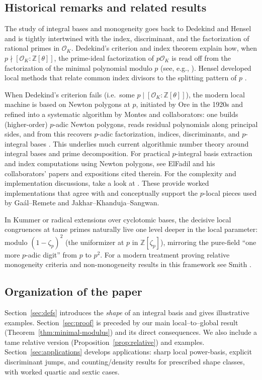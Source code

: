 \documentclass[12pt,a4paper,oneside]{amsart}
\theoremstyle{definition}
\begin{document}
\subsection*{Historical remarks and related results}
The study of integral bases and monogeneity goes back to Dedekind and Hensel and is tightly intertwined with the index, discriminant, and the factorization of rational primes in \(\mathcal O_K\). Dedekind’s criterion and index theorem explain how, when \(p\nmid [\mathcal O_K:\mathbb Z[\theta]]\), the prime-ideal factorization of \(p\mathcal O_K\) is read off from the factorization of the minimal polynomial modulo \(p\) (see, e.g., \cite{Dedekind1878}). Hensel developed local methods that relate common index divisors to the splitting pattern of \(p\) \cite{Hensel1908}. 

When Dedekind’s criterion fails (i.e.\ some \(p\mid [\mathcal O_K:\mathbb Z[\theta]]\)), the modern local machine is based on Newton polygons at \(p\), initiated by Ore in the 1920s and refined into a systematic algorithm by Montes and collaborators: one builds (higher-order) \(p\)-adic Newton polygons, reads residual polynomials along principal sides, and from this recovers \(p\)-adic factorization, indices, discriminants, and \(p\)-integral bases \cite{Ore28,MN92,GMN12,GMN15}. This underlies much current algorithmic number theory around integral bases and prime decomposition. For practical $p$-integral basis extraction and index computations using Newton polygons, see ElFadil and his collaborators’ papers \cite{EMN12,Elf20} and expositions cited therein. For the complexity and implementation discussions, take a look at \cite{BNS13}. These provide worked implementations that agree with and conceptually support the $p$-local pieces used by Ga\'al--Remete and Jakhar--Khanduja--Sangwan.

In Kummer or radical extensions over cyclotomic bases, the decisive local congruences at tame primes naturally live one level deeper in the local parameter: modulo \((1-\zeta_p)^2\) (the uniformizer at \(p\) in \(\mathbb Z[\zeta_p]\)), mirroring the pure-field “one more \(p\)-adic digit” from \(p\) to \(p^2\). For a modern treatment proving relative monogeneity criteria and non-monogeneity results in this framework see Smith \cite{Smi19,Smi21}. 

\subsection*{Organization of the paper}
Section~\ref{sec:defs} introduces the \emph{shape} of an integral basis and gives illustrative examples. Section~\ref{sec:proof} is preceded by our main local–to–global result (Theorem~\ref{thm:minimal-modulus}) and its direct consequences. We also include a tame relative version (Proposition~\ref{prop:relative}) and examples. Section~\ref{sec:applications} develops applications: sharp local power-basis, explicit discriminant jumps, and counting/density results for prescribed shape classes, with worked quartic and sextic cases. 
\end{document}
